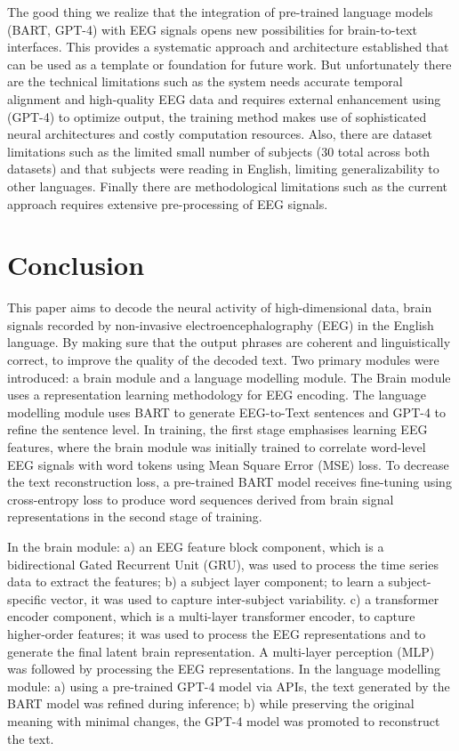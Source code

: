 \documentclass[journal]{IEEEtran}
\begin{document}
The good thing we realize that the integration of pre-trained language models (BART, GPT-4) with EEG signals opens new possibilities for brain-to-text interfaces. This provides a systematic approach and architecture established that can be used as a template or foundation for future work. But unfortunately there are the technical limitations such as the system needs accurate temporal alignment and high-quality EEG data and requires external enhancement using (GPT-4) to optimize output, the training method makes use of sophisticated neural architectures and costly computation resources. Also, there are dataset limitations such as the limited  small number of subjects (30 total across both datasets) and that  subjects were reading in English, limiting generalizability to other languages. Finally there are methodological limitations such as  the current approach requires extensive pre-processing of EEG signals.



\section{Conclusion}

This paper aims to decode the neural activity of high-dimensional data, brain signals recorded by non-invasive electroencephalography (EEG) in the English language. By making sure that the output phrases are coherent and linguistically correct, to improve the quality of the decoded text. Two primary modules were introduced: a brain module and a language modelling module. The Brain module uses a representation learning methodology for EEG encoding. The language modelling module uses BART to generate EEG-to-Text sentences and GPT-4 to refine the sentence level. In training, the first stage emphasises learning EEG features, where the brain module was initially trained to correlate word-level EEG signals with word tokens using Mean Square Error (MSE) loss. To decrease the text reconstruction loss, a pre-trained BART model receives fine-tuning using cross-entropy loss to produce word sequences derived from brain signal representations in the second stage of training.

In the brain module: a) an EEG feature block component, which is a bidirectional Gated Recurrent Unit (GRU), was used to process the time series data to extract the features; b) a subject layer component; to learn a subject-specific vector, it was used to capture inter-subject variability. c) a transformer encoder component, which is a multi-layer transformer encoder, to capture higher-order features; it was used to process the EEG representations and to generate the final latent brain representation. A multi-layer perception (MLP) was followed by processing the EEG representations. In the language modelling module: a) using a pre-trained GPT-4 model via APIs, the text generated by the BART model was refined during inference; b) while preserving the original meaning with minimal changes, the GPT-4 model was promoted to reconstruct the text.
\end{document}
